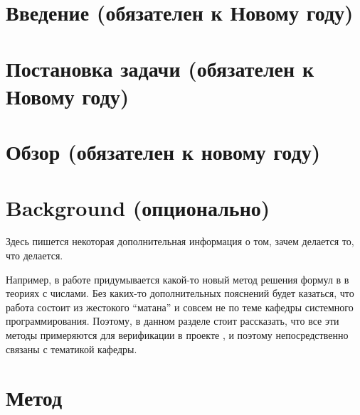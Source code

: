 




\usepackage{totcount}




\maketitle
\setcounter{tocdepth}{2}
\tableofcontents


\section*{Введение (обязателен к Новому году)}


\section{Постановка задачи (обязателен к Новому году)}


\section{Обзор (обязателен к новому году)}


\section{Background (опционально)}
Здесь пишется некоторая дополнительная информация о том, зачем делается то, что делается.

Например, в работе придумывается какой-то новый метод решения формул в \SMT{} в теориях с числами. Без каких-то дополнительных пояснений будет казаться, что работа состоит из жестокого ``матана'' и совсем не по теме кафедры системного программирования.
Поэтому, в данном разделе стоит рассказать, что все эти методы примеряются для верификации в проекте \vsharp{}, и поэтому непосредственно связаны с тематикой кафедры.


\section{Метод}



